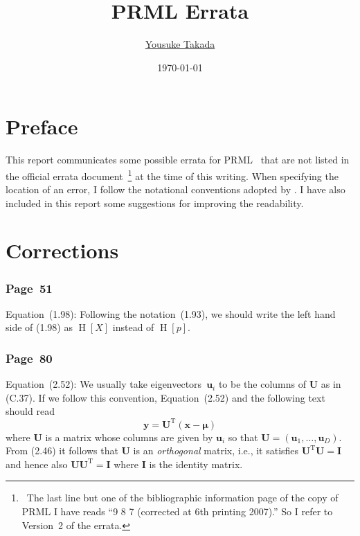 \documentclass[12pt,a4paper]{article}
\newcommand{\erratum}[1]{\subsubsection*{#1}}
\begin{document}
\title{PRML Errata}
\author{\href{mailto:yousuketakada@gmail.com}{Yousuke Takada}}
\date{\today}
\maketitle

\section*{Preface}
This report communicates some possible errata for PRML~\citep{Bishop:PRML}
that are not listed in the official errata document~\citep{Svensen:PRML_errata}\footnote{\
The last line but one of the bibliographic information page of the copy of PRML I have
reads ``9 8 7 (corrected at 6th printing 2007).'' So I refer to Version~2 of the errata.}
at the time of this writing.
When specifying the location of an error, I follow the notational conventions adopted by
\citet{Svensen:PRML_errata}.
I have also included in this report some suggestions for improving the readability.

\section*{Corrections}

\erratum{Page~51}
Equation~(1.98):
Following the notation~(1.93), we should write the left hand side of (1.98) as
$\operatorname{H}[X]$ instead of $\operatorname{H}[p]$.

\erratum{Page~80}
Equation~(2.52):
We usually take eigenvectors~$\mathbf{u}_{i}$ to be the columns of $\mathbf{U}$ as in (C.37).
If we follow this convention, Equation~(2.52) and the following text should read
\begin{equation}
\mathbf{y} = \mathbf{U}^{\operatorname{T}} (\mathbf{x} - \bm{\mu})
\label{eq:change_of_variable_x_to_y}
\end{equation}
where $\mathbf{U}$ is a matrix whose columns are given by $\mathbf{u}_{i}$ so that
$\mathbf{U} = \left( \mathbf{u}_{1}, \dots,  \mathbf{u}_{D}\right)$.
From (2.46) it follows that $\mathbf{U}$ is an \emph{orthogonal} matrix, i.e.,
it satisfies $\mathbf{U}^{\operatorname{T}}\mathbf{U} = \mathbf{I}$ and hence also
$\mathbf{U}\mathbf{U}^{\operatorname{T}} = \mathbf{I}$ where $\mathbf{I}$ is the identity matrix.
\end{document}
